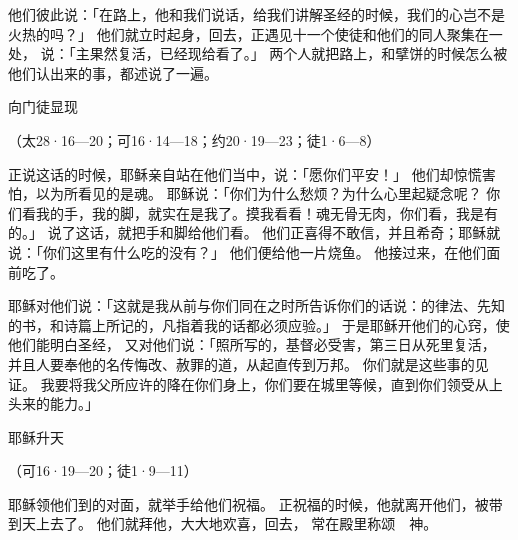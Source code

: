 {他们彼此说：「在路上，他和我们说话，给我们讲解圣经的时候，我们的心岂不是火热的吗？」
他们就立时起身，回{}去，正遇见十一个使徒和他们的同人聚集在一处，
说：「主果然复活，已经现给{}看了。」
两个人就把路上{}，和擘饼的时候怎么被他们认出来的事，都述说了一遍。
\par }{\SH 向门徒显现
\par }{\R （太28·16—20；可16·14—18；约20·19—23；徒1·6—8）
\par }{\PP {}正说这话的时候，耶稣亲自站在他们当中，说：「愿你们平安！」
他们却惊慌害怕，以为所看见的是魂。
耶稣说：「你们为什么愁烦？为什么心里起疑念呢？
你们看我的手，我的脚，就{}实在是我了。摸我看看！魂无骨无肉，你们看，我是有的。」
说了这话，就把手和脚给他们看。
他们正喜得不敢信，并且希奇；耶稣就说：「你们这里有什么吃的没有？」
他们便给他一片烧鱼。
他接过来，在他们面前吃了。
\par }{\PP {}耶稣对他们说：「这就是我从前与你们同在之时所告诉你们的话说：{}的律法、先知的书，和诗篇上所记的，凡指着我的话都必须应验。」
于是耶稣开他们的心窍，使他们能明白圣经，
又对他们说：「照{}所写的，基督必受害，第三日从死里复活，
并且人要奉他的名传悔改、赦罪的道，从{}起直传到万邦。
你们就是这些事的见证。
我要将我父所应许的降在你们身上，你们要在城里等候，直到你们领受从上头来的能力。」
\par }{\SH 耶稣升天
\par }{\R （可16·19—20；徒1·9—11）
\par }{\PP {}耶稣领他们到{}的对面，就举手给他们祝福。
正祝福的时候，他就离开他们，被带到天上去了。
他们就拜他，大大地欢喜，回{}去，
常在殿里称颂　神。
\par }